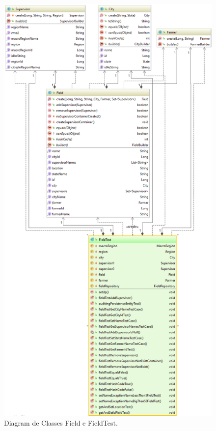 \begin{figure}[H]
	\centering
	\includegraphics[scale=0.58]{dados/figuras/PackagebaseTestField.png}
	\caption{Diagram de Classes Field e FieldTest.}
	\label{diagrmaTestField}
\end{figure}

